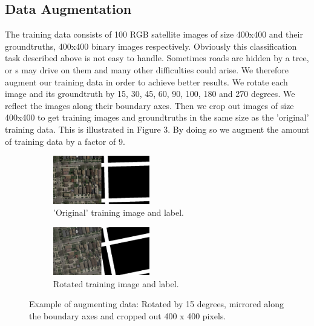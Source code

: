 \documentclass[10pt,conference,compsocconf]{IEEEtran}
\begin{document}
\subsection{Data Augmentation}

The training data consists of 100 RGB satellite images of size 400x400 and their groundtruths, 400x400 binary images respectively. 
Obviously this classification task described above is not easy to handle. Sometimes roads are hidden by a tree, or s may drive on them and many other difficulties could arise. 
We therefore augment our training data in order to achieve better results. We rotate each image and its groundtruth by 15, 30, 45, 60, 90, 100, 180 and 270 degrees. We reflect the images along their boundary axes. Then we crop out images of size 400x400 to get training images and groundtruths in the same size as the 'original' training data. This is illustrated in Figure 3. By doing so we augment the amount of training data by a factor of 9.




\begin{figure}[H]
	\centering
	\begin{subfigure}[htb]{0.2\textwidth}
		\includegraphics[width=4.2cm]{images/data_augment.png}
		\caption{'Original' training image and label.}
		\label{fig:dat}
	\end{subfigure}
	\hspace{1.5em}
	\begin{subfigure}[htb]{0.2\textwidth}
		\includegraphics[width=4.2cm]{images/data_augment_rot.png}
		\caption{Rotated training image and label.}
		\label{fig:datrot}
	\end{subfigure}
	\caption{Example of augmenting data: Rotated by 15 degrees, mirrored along the boundary axes and cropped out 400 x 400 pixels.}
\end{figure}
\end{document}
